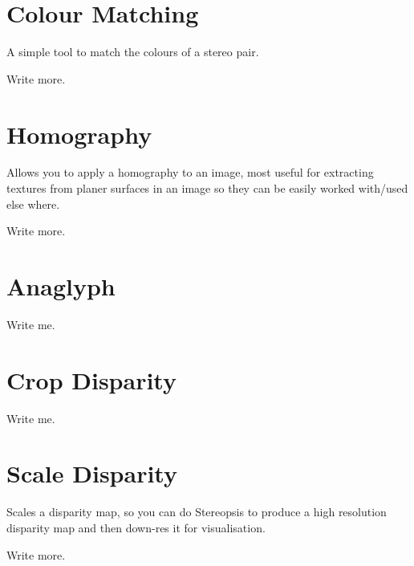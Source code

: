 \documentclass[10pt,a4paper,twoside]{article}
\begin{document}
\section{Colour Matching}
A simple tool to match the colours of a stereo pair.

Write more.



\section{Homography}
Allows you to apply a homography to an image, most useful for extracting textures from planer surfaces in an image so they can be easily worked with/used else where.

Write more.



\section{Anaglyph}
Write me.



\section{Crop Disparity}
Write me.



\section{Scale Disparity}
Scales a disparity map, so you can do Stereopsis to produce a high resolution disparity map and then down-res it for visualisation.

Write more.
\end{document}
